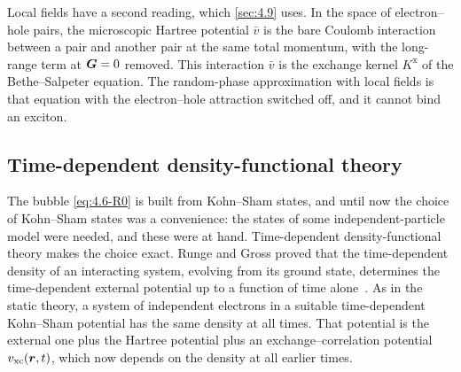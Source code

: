 Local fields have a second reading, which \cref{sec:4.9} uses. In the space of electron--hole pairs, the microscopic Hartree potential $\bar v$ is the bare Coulomb interaction between a pair and another pair at the same total momentum, with the long-range term at $\bm{G} = 0$ removed. This interaction $\bar v$ is the exchange kernel $K^{\mathrm{x}}$ of the Bethe--Salpeter equation. The random-phase approximation with local fields is that equation with the electron--hole attraction switched off, and it cannot bind an exciton.

\subsection{Time-dependent density-functional theory}

The bubble \cref{eq:4.6-R0} is built from Kohn--Sham states, and until now the choice of Kohn--Sham states was a convenience: the states of some independent-particle model were needed, and these were at hand. Time-dependent density-functional theory makes the choice exact. Runge and Gross proved that the time-dependent density of an interacting system, evolving from its ground state, determines the time-dependent external potential up to a function of time alone~\cite{runge1984density}. As in the static theory, a system of independent electrons in a suitable time-dependent Kohn--Sham potential has the same density at all times. That potential is the external one plus the Hartree potential plus an exchange--correlation potential $v_{\mathrm{xc}}(\bm{r},t)$, which now depends on the density at all earlier times.

